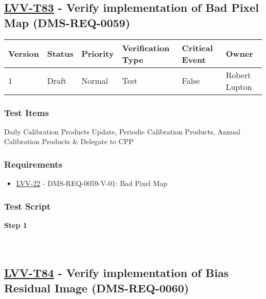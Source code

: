 \hypertarget{lvv-t83---verify-implementation-of-bad-pixel-map-dms-req-0059}{%
\subsection{\texorpdfstring{\href{https://jira.lsstcorp.org/secure/Tests.jspa\#/testCase/LVV-T83}{LVV-T83}
- Verify implementation of Bad Pixel Map
(DMS-REQ-0059)}{LVV-T83 - Verify implementation of Bad Pixel Map (DMS-REQ-0059)}}\label{lvv-t83---verify-implementation-of-bad-pixel-map-dms-req-0059}}

\begin{longtable}[]{@{}llllll@{}}
\toprule
Version & Status & Priority & Verification Type & Critical Event &
Owner\tabularnewline
\midrule
\endhead
1 & Draft & Normal & Test & False & Robert Lupton\tabularnewline
\bottomrule
\end{longtable}

\hypertarget{test-items-59}{%
\subsubsection{Test Items}\label{test-items-59}}

Daily Calibration Products Update, Periodic Calibration Products, Annual
Calibration Products \& Delegate to CPP

\hypertarget{requirements-60}{%
\subsubsection{Requirements}\label{requirements-60}}

\begin{itemize}
\tightlist
\item
  \href{https://jira.lsstcorp.org/browse/LVV-22}{LVV-22} -
  DMS-REQ-0059-V-01: Bad Pixel Map
\end{itemize}

\hypertarget{test-script-60}{%
\subsubsection{Test Script}\label{test-script-60}}

\textbf{Step 1}\\
~\\
~\\

\hypertarget{lvv-t84---verify-implementation-of-bias-residual-image-dms-req-0060}{%
\subsection{\texorpdfstring{\href{https://jira.lsstcorp.org/secure/Tests.jspa\#/testCase/LVV-T84}{LVV-T84}
- Verify implementation of Bias Residual Image
(DMS-REQ-0060)}{LVV-T84 - Verify implementation of Bias Residual Image (DMS-REQ-0060)}}\label{lvv-t84---verify-implementation-of-bias-residual-image-dms-req-0060}}

